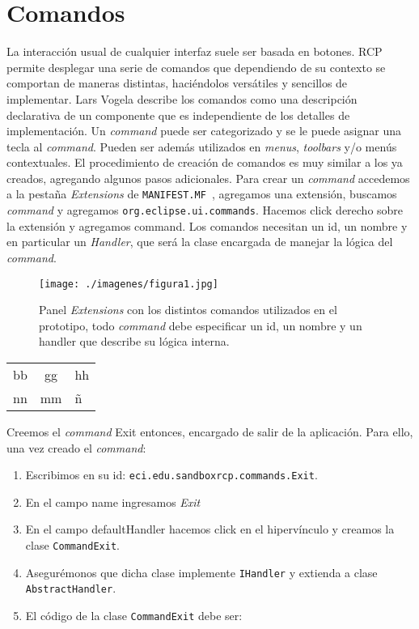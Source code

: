 \documentclass[journal]{IEEEtran}
\newcommand{\mnf}{\texttt{MANIFEST.MF~}}
\begin{document}
\section{Comandos}
La interacción usual de cualquier interfaz suele ser basada en botones. RCP permite desplegar una serie de comandos que dependiendo de su contexto 
se comportan de maneras distintas, haciéndolos versátiles y sencillos de implementar.
Lars Vogela \cite{VoLa} describe los comandos como una descripción declarativa de un componente que es independiente de los detalles de implementación. 
Un \textit{command} puede ser categorizado y se le puede asignar una tecla al \textit{command}. Pueden ser además utilizados en \textit{menus}, \textit{toolbars} y/o menús contextuales.
El procedimiento de creación de comandos es muy similar a los ya creados, agregando algunos pasos adicionales.
Para crear un \textit{command} accedemos a la pestaña \textit{Extensions} de \mnf, agregamos una extensión, buscamos \textit{command} y agregamos \texttt{org.eclipse.ui.commands}. 
Hacemos click derecho sobre la extensión y agregamos command. Los comandos necesitan un id, un nombre y en particular un \textit{Handler}, que será la clase 
encargada de manejar la lógica del \textit{command}.
\begin{center}
 \begin{figure}
 \centering
 \texttt{[image: ./imagenes/figura1.jpg]}
 \caption{Panel \textit{Extensions} con los distintos comandos utilizados en el prototipo, todo \textit{command} debe especificar un id, un nombre y un handler que 
	  describe su lógica interna.}
\end{figure}
\end{center}

\begin{center}
\begin{tabular}{|l|c|l|}\hline
bb & gg & hh\\
nn & mm & ñ\\\hline
\end{tabular}
\end{center}


Creemos el \textit{command} Exit entonces, encargado de salir de la aplicación. Para ello, una vez creado el \textit{command}:
\begin{enumerate}
 \item Escribimos en su id: \texttt{eci.edu.sandboxrcp.commands.Exit}. 
 \item En el campo name ingresamos \textit{Exit}
 \item En el campo defaultHandler  hacemos click en el hipervínculo y creamos la clase \texttt{CommandExit}.
 \item Asegurémonos que dicha clase implemente \texttt{IHandler} y extienda a clase \texttt{AbstractHandler}.
 \item El código de la clase \texttt{CommandExit} debe ser:
\end{enumerate}
\end{document}
